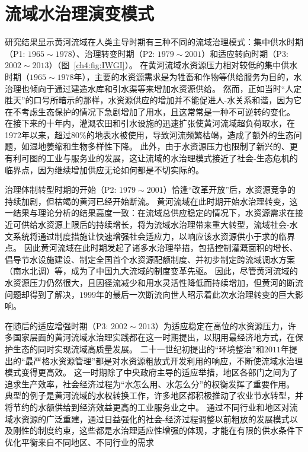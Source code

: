 \section{流域水治理演变模式}

研究结果显示黄河流域在人类主导时期有三种不同的流域治理模式：集中供水时期（P1: $1965 \sim 1978$）、治理转变时期（P2: $1979 \sim 2001$）和适应转向时期（P3: $2002 \sim 2013$）（图~\ref{ch4:fig:IWGI}）。
在黄河流域水资源压力相对较低的集中供水时期（$1965 \sim 1978$年），主要的水资源需求是为牲畜和作物等供给服务为目的，水治理也倾向于通过建造水库和引水渠等来增加水资源供给。
然而，正如当时“人定胜天”的口号所暗示的那样，水资源供应的增加并不能促进人-水关系和谐，因为它在不考虑生态保护的情况下急剧增加了用水，且这常常是一种不可逆转的变化\cite{zhou2020}。
在接下来的十年内，灌溉农田和引水设施的迅速扩张使黄河流域超负荷取水，在1972年以来，超过$80\%$的地表水被使用，导致河流频繁枯竭，造成了额外的生态问题，如湿地萎缩和生物多样性下降\cite{wang2019c}。
此外，由于水资源压力也限制了新兴的、更有利可图的工业与服务业的发展，这让流域的水治理模式接近了社会-生态危机的临界点，因为继续增加供应无论如何都是不切实际的\cite{loch2020, wohlfart2016a}。

治理体制转型时期的开始（P2: $1979 \sim 2001$）恰逢“改革开放”后，水资源竞争的持续加剧，但枯竭的黄河已经开始断流。
黄河流域在此时期开始水治理转变，这一结果与理论分析的结果高度一致：在流域总供应稳定的情况下，水资源需求在接近可供给水资源上限后的持续增长，将为流域水治理带来重大转型，流域社会-水文系统将通过制度措施让快速增强社会适应力，以响应该水资源供小于求的临界点\cite{loch2020}。
因此黄河流域在此时期发起了诸多水治理举措，包括控制灌溉面积的增长、倡导节水设施建设、制定全国首个水资源配额制度、并初步制定跨流域调水方案（南水北调）等\cite{wang2019b,long2020,nickum2021}，成为了中国九大流域的制度变革先驱。
因此，尽管黄河流域的水资源压力仍然很大，且因径流减少和用水灵活性降低而持续增加，但黄河的断流问题却得到了解决，$1999$年的最后一次断流向世人昭示着此次水治理转变的巨大影响\cite{wang2019b}。

在随后的适应增强时期（P3: $2002 \sim 2013$）为适应稳定在高位的水资源压力，许多国家层面的黄河流域水治理实践都在这一时期提出，以期用最经济地方式，在保护生态的同时实现流域高质量发展。
二十一世纪初提出的“环境整治”和$2011$年提出的“最严格水资源管理”都是对水资源粗放式开发利用的响应，不断使流域水治理模式变得更高效。
这一时期除了中央政府主导的适应举措，地区各部门之间为了追求生产效率，社会经济过程为“水怎么用、水怎么分”的权衡发挥了重要作用。
典型的例子是黄河流域的水权转换工作，许多地区都积极推动了农业节水转型，并将节约的水额供给到经济效益更高的工业服务业之中。
通过不同行业和地区对流域水资源的广泛重建，通过日益强化的社会-经济过程调整以前粗放的发展模式以及刚性的制度约束，这些都是水治理适应性增强的体现，才能在有限的供水条件下优化平衡来自不同地区、不同行业的需求\cite{dalin2015,song2022}

